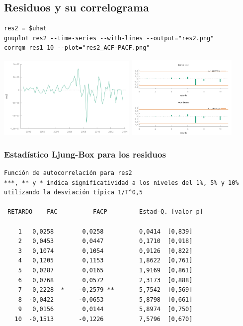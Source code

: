 \documentclass[10pt]{article}
\begin{document}
\subsection*{Residuos y su correlograma}
\label{sec:org41c3e30}

\begin{verbatim}
res2 = $uhat
gnuplot res2 --time-series --with-lines --output="res2.png"
corrgm res1 10 --plot="res2_ACF-PACF.png"
\end{verbatim}

\begin{center}
\includegraphics[width=0.5\textwidth]{./SerieCuentasFinancierasBE/res2.png} 
\includegraphics[width=0.4\textwidth]{./SerieCuentasFinancierasBE/res2_ACF-PACF.png}
\end{center}
\subsubsection*{Estadístico Ljung-Box para los residuos}
\label{sec:org1ef2009}

\begin{verbatim}
Función de autocorrelación para res2
***, ** y * indica significatividad a los niveles del 1%, 5% y 10%
utilizando la desviación típica 1/T^0,5

 RETARDO    FAC          FACP         Estad-Q. [valor p]

    1   0,0258        0,0258          0,0414  [0,839]
    2   0,0453        0,0447          0,1710  [0,918]
    3   0,1074        0,1054          0,9126  [0,822]
    4   0,1205        0,1153          1,8622  [0,761]
    5   0,0287        0,0165          1,9169  [0,861]
    6   0,0768        0,0572          2,3173  [0,888]
    7  -0,2228  *    -0,2579 **       5,7542  [0,569]
    8  -0,0422       -0,0653          5,8798  [0,661]
    9   0,0156        0,0144          5,8974  [0,750]
   10  -0,1513       -0,1226          7,5796  [0,670]
\end{verbatim}
\end{document}
